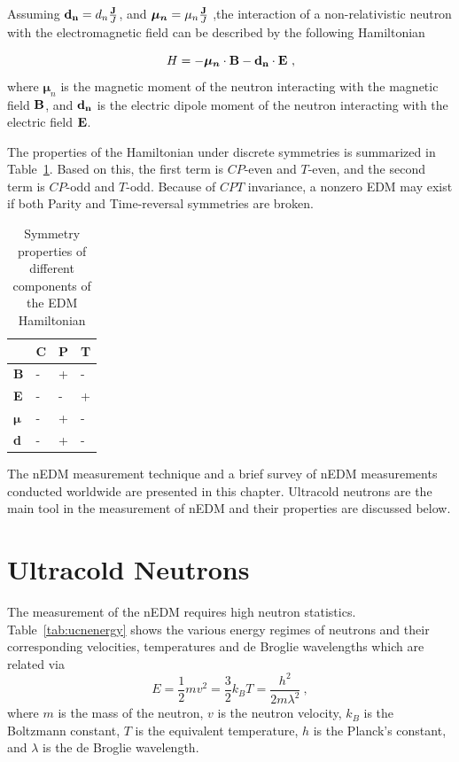 Assuming ${\bf{d_n}} = d_n \frac{\bf{J}}{J}$, and
$\boldsymbol{\mu_n} = \mu_n \frac{\bf{J}}{J}$ ,the interaction of a
non-relativistic neutron with the electromagnetic field can be
described by the following Hamiltonian

\begin{equation}
  \label{eqn:hamiltonian}
 H= -\boldsymbol{\mu_n} \cdot \bf{B} - \bf{d}_n \cdot \bf{E}~,
 \end{equation}
where $\boldsymbol{\mu}_n$ is the magnetic moment of the neutron
interacting with the magnetic field $\bf{B}$, and $\bf{d}_n$ is
the electric dipole moment of the neutron interacting with the
electric field $\bf{E}$.

The properties of the Hamiltonian under discrete symmetries is
summarized in Table~\ref{tab:Hsymmetry}. Based on this, the first term
is $CP$-even and $T$-even, and the second term is $CP$-odd and
$T$-odd. Because of $CPT$ invariance, a nonzero EDM may exist if
both Parity and Time-reversal symmetries are broken.


\begin{table}[h!]
\begin{center}
\begin{tabular}{| l | l | l | l |} 
\hline
 & C & P & T \\ \hline
\textbf{B} & - &+ &- \\ \hline
\textbf{E} & -&- &+ \\ \hline
$\boldsymbol{\mu}$ &- &+ &- \\ \hline 
\textbf{d} & -&+ &- \\ \hline
\end{tabular}
\caption{Symmetry properties of different components of the EDM
  Hamiltonian  \label{tab:Hsymmetry}}
\end{center}
\end{table}
  
The nEDM measurement technique and a brief survey of nEDM measurements
conducted worldwide are presented in this chapter. Ultracold neutrons
are the main tool in the measurement of nEDM and their properties are
discussed below.
\section{Ultracold Neutrons\label{sec:ucnproperties}}
The measurement of the nEDM requires high neutron statistics.
Table~\ref{tab:ucnenergy} shows the various energy regimes of neutrons
and their corresponding velocities, temperatures and de Broglie
wavelengths which are related via
\begin{equation}
  \label{eqn:ucnenergy}
  E = \frac{1}{2} m v^2 = \frac{3}{2} k_B T = \frac{h^2}{2m \lambda^2}~,
\end{equation}
where $m$ is the mass of the neutron, $v$ is the neutron velocity,
$k_B$ is the Boltzmann constant, $T$ is the equivalent temperature,
$h$ is the Planck's constant, and $\lambda$ is the de Broglie
wavelength.

